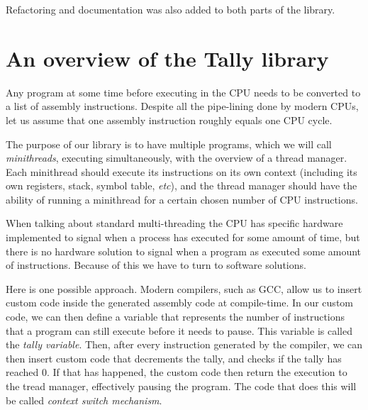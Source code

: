 \documentclass[12pt,a4paper]{report}
\begin{document}
Refactoring and documentation was also added to both parts of the library.

\clearpage
\clearpage
\chapter{An overview of the Tally library} \label{overview}
Any program at some time before executing in the CPU needs to be converted to a list of assembly instructions. Despite all the pipe-lining done by modern CPUs, let us assume that one assembly instruction roughly equals one CPU cycle.

The purpose of our library is to have multiple programs, which we will call \textit{minithreads}, executing simultaneously, with the overview of a thread manager. Each minithread should execute its instructions on its own context (including its own registers, stack, symbol table, \textit{etc}), and the thread manager should have the ability of running a minithread for a certain chosen number of CPU instructions.

When talking about standard multi-threading the CPU has specific hardware implemented to signal when a process has executed for some amount of time, but there is no hardware solution to signal when a program as executed some amount of instructions. Because of this we have to turn to software solutions.

Here is one possible approach. Modern compilers, such as GCC, allow us to insert custom code inside the generated assembly code at compile-time.
In our custom code, we can then define a variable that represents the number of instructions that a program can still execute before it needs to pause. This variable is called the \textit{tally variable}. Then, after every instruction generated by the compiler, we can then insert custom code that decrements the tally, and checks if the tally has reached 0. If that has happened, the custom code then return the execution to the tread manager, effectively pausing the program. The code that does this will be called \textit{context switch mechanism}.
\end{document}
